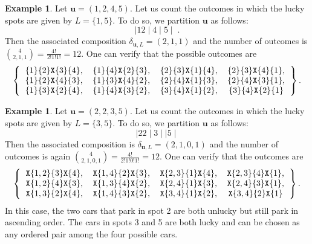 \documentclass[reqno]{amsart}
\newcommand{\X}{\texttt{X}}
\theoremstyle{definition}
\newtheorem{example}[theorem]{Example}
\theoremstyle{remark}
\newcommand{\bsy}{\boldsymbol}
\begin{document}
\begin{example}
    Let $\bsy{u} = (1,2,4,5)$.
    Let us count the outcomes in which the lucky spots are given by $L = \{1, 5\}$. 
    To do so, we partition $\bsy{u}$ as follows:
    \[
    \mid 12 \mid 4  \mid 5\mid \;.
    \]
    Then the associated composition $\delta_{\bsy u, L}=(2,1,1)$ and the number of outcomes is $\binom{4 }{ 2,1,1} = \frac{4!}{2!1!1!} = 12$. 
    One can verify that the possible outcomes are
    \[ \left\{
    \begin{tabular}{cccc}
        $\{1\}\{2\} \X \{3\}\{4\}$, &
        $\{1\}\{4\}\X\{2\}\{3\}$, &
        $\{2\}\{3\}\X \{1\}\{4\}$, &
        $\{2\}\{3\} \X\{4\}\{1\}$,\\
        $\{1\}\{2\}\X \{4\}\{3\}$, &
        $\{1\}\{3\}\X\{4\}\{2\}$, &
        $\{2\}\{4\} \X\{1\}\{3\}$, &
        $\{2\}\{4\}\X\{3\}\{1\}$, \\     
        $\{1\}\{3\}\X\{2\}\{4\}$, &
        $\{1\}\{4\}\X \{3\}\{2\}$, &
        $\{3\}\{4\} \X\{1\}\{2\}$, &
        $\{3\}\{4\} \X\{2\}\{1\}$
         \end{tabular}
    \right\}.
    \]
\end{example}

\begin{example}
    Let $\bsy{u} = (2,2,3,5)$.
    Let us count the outcomes in which the lucky spots are given by $L = \{3, 5\}$. 
    To do so, we partition $\bsy{u}$ as follows:
    \[
    \mid 22 \mid 3  \mid\mid 5\mid
    \]
    Then the associated composition is $\delta_{\bsy u, L}=(2,1,0,1)$ and the number of outcomes is again $\binom{4}{2,1,0,1} = \frac{4!}{2!1!0!1!} = 12$. 
    One can verify that the outcomes are
    \[ \left\{
    \begin{tabular}{cccc}
        $\X\{1, 2\} \{3\}\X\{4\}$, &
        $\X\{1, 4\}\{2\}\X\{3\}$, &
        $\X\{2, 3\} \{1\}\X\{4\}$, &
        $\X\{2, 3\} \{4\}\X\{1\}$,\\
        $\X\{1, 2\}\{4\}\X\{3\}$, &
        $\X\{1,3\}\{4\}\X\{2\}$, &
        $\X\{2, 4\} \{1\}\X\{3\}$, &
        $\X\{2, 4\}\{3\}\X\{1\}$, \\     
        $\X\{1, 3\}\{2\}\X\{4\}$, &
        $\X\{1,4\} \{3\}\X\{2\}$, &
        $\X\{3, 4\} \{1\}\X\{2\}$, &
        $\X\{3, 4\} \{2\}\X\{1\}$
         \end{tabular}
    \right\}.
    \]
In this case, the two cars that park in spot 2 are both unlucky but still park in ascending order. The cars in spots 3 and 5 are both lucky and can be chosen as any ordered pair among the four possible cars.
\end{example}
\end{document}
